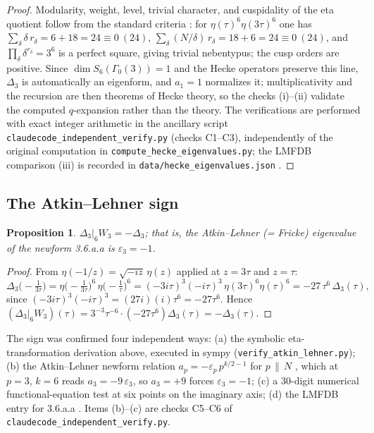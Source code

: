 \documentclass[11pt,reqno]{amsart}
\theoremstyle{plain}
\newtheorem{proposition}[theorem]{Proposition}
\theoremstyle{definition}
\theoremstyle{remark}
\newcommand{\eps}{\varepsilon}
\newcommand{\Dthree}{\Delta_{3}}
\begin{document}
\begin{proof}
Modularity, weight, level, trivial character, and cuspidality of the
eta quotient follow from the standard criteria
\cite[\S1.4]{Ono2004}: for $\eta(\tau)^6\eta(3\tau)^6$ one has
$\sum_\delta \delta\,r_\delta=6+18=24\equiv0\ (24)$,
$\sum_\delta (N/\delta)\,r_\delta=18+6=24\equiv0\ (24)$, and
$\prod_\delta \delta^{r_\delta}=3^6$ is a perfect square, giving
trivial nebentypus; the cusp orders are positive.  Since
$\dim S_6(\Gamma_0(3))=1$ \cite{DiamondShurman2005,LMFDB} and the
Hecke operators preserve this line, $\Dthree$ is automatically an
eigenform, and $a_1=1$ normalizes it; multiplicativity and the
recursion are then theorems of Hecke theory, so the checks (i)--(ii)
validate the computed $q$-expansion rather than the theory.  The
verifications are performed with exact integer arithmetic in the
ancillary script \texttt{claudecode\_independent\_verify.py} (checks
C1--C3), independently of the original computation in
\texttt{compute\_hecke\_eigenvalues.py}; the LMFDB comparison (iii) is
recorded in \texttt{data/hecke\_eigenvalues.json}
\cite{LMFDB}.
\end{proof}

\subsection{The Atkin--Lehner sign}

\begin{proposition}\label{prop:AL}
$\Dthree|_6W_3=-\Dthree$; that is, the Atkin--Lehner (= Fricke)
eigenvalue of the newform \textsf{3.6.a.a} is $\eps_3=-1$.
\end{proposition}

\begin{proof}
From $\eta(-1/z)=\sqrt{-iz}\,\eta(z)$ applied at $z=3\tau$ and
$z=\tau$:
\[
\Dthree\!\big(-\tfrac1{3\tau}\big)
=\eta\!\big(-\tfrac1{3\tau}\big)^6\,\eta\!\big(-\tfrac1{\tau}\big)^6
=(-3i\tau)^3(-i\tau)^3\,\eta(3\tau)^6\eta(\tau)^6
=-27\,\tau^6\,\Dthree(\tau),
\]
since $(-3i\tau)^3(-i\tau)^3=(27i)(i)\tau^6=-27\tau^6$.  Hence
$(\Dthree|_6W_3)(\tau)=3^{-3}\tau^{-6}\cdot(-27\tau^6)\Dthree(\tau)
=-\Dthree(\tau)$.
\end{proof}

The sign was confirmed four independent ways: (a) the symbolic
eta-transformation derivation above, executed in sympy
(\texttt{verify\_atkin\_lehner.py}); (b) the Atkin--Lehner newform
relation $a_p=-\eps_p\,p^{k/2-1}$ for $p\,\|\,N$
\cite{AtkinLehner1970}, which at $p=3$, $k=6$ reads
$a_3=-9\,\eps_3$, so $a_3=+9$ forces $\eps_3=-1$; (c) a $30$-digit
numerical functional-equation test at six points on the imaginary
axis; (d) the LMFDB entry for \textsf{3.6.a.a} \cite{LMFDB}.  Items
(b)--(c) are checks C5--C6 of
\texttt{claudecode\_independent\_verify.py}.
\end{document}
